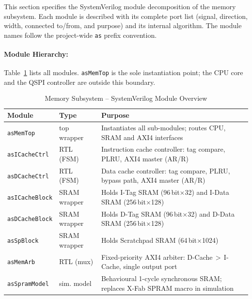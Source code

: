 
\label{sec:memsysfunc01}

This section specifies the SystemVerilog module decomposition of the memory subsystem. Each module is described with its complete port list (signal, direction, width, connected to/from, and purpose) and its internal algorithm. The module names follow the project-wide \texttt{as} prefix convention.

\paragraph{Module Hierarchy:}
\label{subsubsec:modHierarchy}

Table~\ref{tab:asModHierarchya} lists all modules.
\texttt{asMemTop} is the sole instantiation point; the CPU core and the
QSPI controller are outside this boundary.

\begin{table}[H]
\caption{Memory Subsystem -- SystemVerilog Module Overview}
\label{tab:asModHierarchya}
\centering
\begin{tabularx}{\textwidth}{|l |l |X|}
  \hline
  Module & Type & Purpose \\
  \hline
  \hline
  \texttt{asMemTop}      & top wrapper   & Instantiates all sub-modules; routes CPU, SRAM and AXI4 interfaces \\
  \hline
  \texttt{asICacheCtrl}  & RTL (FSM)     & Instruction cache controller: tag compare, PLRU, AXI4 master (AR/R) \\
  \hline
  \texttt{asDCacheCtrl}  & RTL (FSM)     & Data cache controller: tag compare, PLRU, bypass path, AXI4 master (AR/R) \\
  \hline
  \texttt{asICacheBlock} & SRAM wrapper  & Holds I-Tag SRAM (96\,bit$\times$32) and I-Data SRAM (256\,bit$\times$128) \\
  \hline
  \texttt{asDCacheBlock} & SRAM wrapper  & Holds D-Tag SRAM (96\,bit$\times$32) and D-Data SRAM (256\,bit$\times$128) \\
  \hline
  \texttt{asSpBlock}     & SRAM wrapper  & Holds Scratchpad SRAM (64\,bit$\times$1024) \\
  \hline
  \texttt{asMemArb}      & RTL (mux)     & Fixed-priority AXI4 arbiter: D-Cache\,$>$\,I-Cache, single output port \\
  \hline
  \texttt{asSpramModel}  & sim. model    & Behavioural 1-cycle synchronous SRAM; replaces X-Fab SPRAM macro in simulation \\
  \hline
\end{tabularx}
\end{table}

